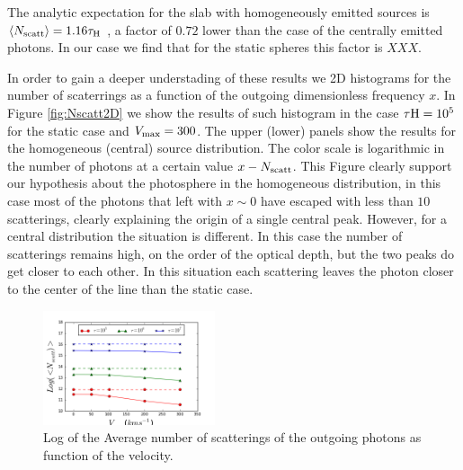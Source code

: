 \documentclass[usenatbib]{mn2e}
\newcommand{\kms}{{\ifmmode{{\mathrm{\,km\ s}^{-1}}}\else{\,km~s$^{-1}$}\fi}}
\begin{document}
The analytic expectation for the slab with homogeneously emitted
sources is $\langle N_{\rm  scatt}\rangle=1.16\tau_{\rm   H}$
\citep{Harrington73}, a factor of $0.72$ lower than the case of the
centrally emitted photons. In our case we find that for the static
spheres this factor is $XXX$.


In order to gain a deeper understading of these results we 2D
histograms for the number of scaterrings as a function of the outgoing
dimensionless frequency $x$. In Figure \ref{fig:Nscatt2D} we show
the results of such histogram in the case $\tau{\rm H}=10^5$ for the
static case and $V_{\rm max}=300$\kms. The upper (lower) panels show the
results for the homogeneous (central) source distribution. The color
scale is logarithmic in the number of photons at a certain value
$x-N_{\rm scatt}$. This Figure clearly support our hypothesis about
the photosphere in the homogeneous distribution, in this case most of
the photons that left with $x\sim 0$ have escaped with less than $10$
scatterings, clearly explaining the origin of a single central
peak. However, for a central distribution the situation is
different. In this case the number of scatterings remains high, on the
order of the optical depth, but the two peaks do get closer to each
other. In this situation each scattering leaves the photon closer to
the center of the line than the static case.

\begin{figure}
    \includegraphics[width=0.45\textwidth]{NscattvsVmax.png}
\caption{Log of the Average number of scatterings of the outgoing
  photons as function of the velocity. \label{fig:Nscatt}}  
\end{figure}
\end{document}
